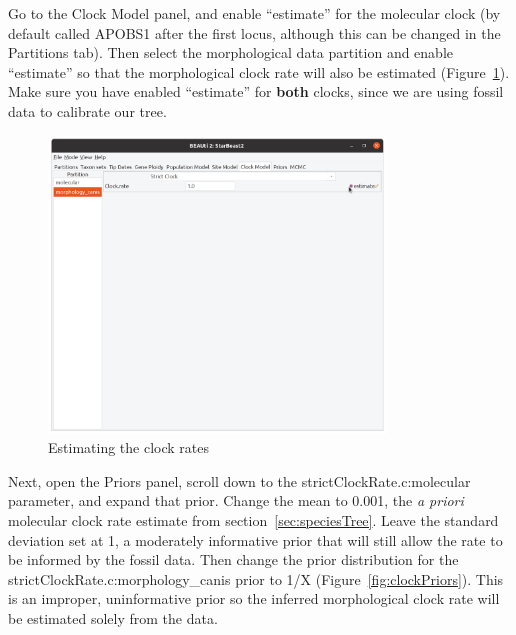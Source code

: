 \documentclass[12pt]{article}
\begin{document}
Go to the Clock Model panel, and enable ``estimate'' for the
molecular clock (by default called APOBS1 after the first locus, although
this can be changed in the Partitions tab). Then select the morphological
data partition and enable ``estimate'' so that the morphological
clock rate will also be estimated (Figure~\ref{fig:estimateMorphClock}).
Make sure you have enabled ``estimate'' for \textbf{both} clocks, since we
are using fossil data to calibrate our tree.

\begin{figure}[htb!]
\centering
\includegraphics[width=0.8\textwidth]{figures/estimateMorphClock.png}
\caption
{Estimating the clock rates}
\label{fig:estimateMorphClock}
\end{figure}

Next, open the Priors panel, scroll down to the strictClockRate.c:molecular
parameter, and expand that prior. Change the mean to 0.001, the \textit{a
priori} molecular clock rate estimate from section~\ref{sec:speciesTree}.
Leave the standard deviation set at 1, a moderately informative prior that
will still allow the rate to be informed by the fossil data. Then change the
prior distribution for the strictClockRate.c:morphology\_canis prior to 1/X
(Figure~\ref{fig:clockPriors}). This is an improper, uninformative prior so
the inferred morphological clock rate will be estimated solely from the data.
\end{document}
